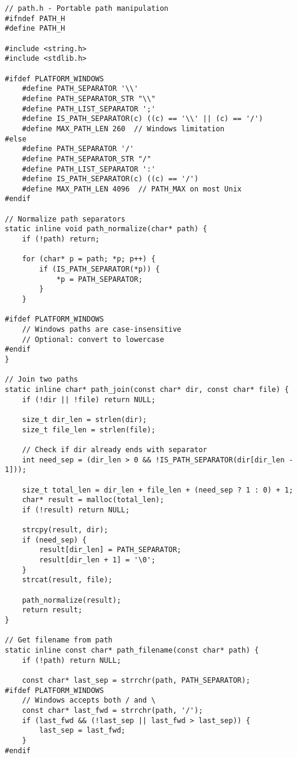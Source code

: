 \begin{lstlisting}
// path.h - Portable path manipulation
#ifndef PATH_H
#define PATH_H

#include <string.h>
#include <stdlib.h>

#ifdef PLATFORM_WINDOWS
    #define PATH_SEPARATOR '\\'
    #define PATH_SEPARATOR_STR "\\"
    #define PATH_LIST_SEPARATOR ';'
    #define IS_PATH_SEPARATOR(c) ((c) == '\\' || (c) == '/')
    #define MAX_PATH_LEN 260  // Windows limitation
#else
    #define PATH_SEPARATOR '/'
    #define PATH_SEPARATOR_STR "/"
    #define PATH_LIST_SEPARATOR ':'
    #define IS_PATH_SEPARATOR(c) ((c) == '/')
    #define MAX_PATH_LEN 4096  // PATH_MAX on most Unix
#endif

// Normalize path separators
static inline void path_normalize(char* path) {
    if (!path) return;

    for (char* p = path; *p; p++) {
        if (IS_PATH_SEPARATOR(*p)) {
            *p = PATH_SEPARATOR;
        }
    }

#ifdef PLATFORM_WINDOWS
    // Windows paths are case-insensitive
    // Optional: convert to lowercase
#endif
}

// Join two paths
static inline char* path_join(const char* dir, const char* file) {
    if (!dir || !file) return NULL;

    size_t dir_len = strlen(dir);
    size_t file_len = strlen(file);

    // Check if dir already ends with separator
    int need_sep = (dir_len > 0 && !IS_PATH_SEPARATOR(dir[dir_len - 1]));

    size_t total_len = dir_len + file_len + (need_sep ? 1 : 0) + 1;
    char* result = malloc(total_len);
    if (!result) return NULL;

    strcpy(result, dir);
    if (need_sep) {
        result[dir_len] = PATH_SEPARATOR;
        result[dir_len + 1] = '\0';
    }
    strcat(result, file);

    path_normalize(result);
    return result;
}

// Get filename from path
static inline const char* path_filename(const char* path) {
    if (!path) return NULL;

    const char* last_sep = strrchr(path, PATH_SEPARATOR);
#ifdef PLATFORM_WINDOWS
    // Windows accepts both / and \
    const char* last_fwd = strrchr(path, '/');
    if (last_fwd && (!last_sep || last_fwd > last_sep)) {
        last_sep = last_fwd;
    }
#endif


\end{lstlisting}
